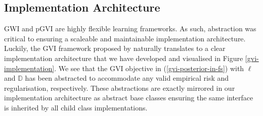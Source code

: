 \documentclass{article}
\numberwithin{equation}{section}
\begin{document}
\subsection{Implementation Architecture}\label{implementation-architecture}
GWI and pGVI are highly flexible learning frameworks. As such, abstraction was critical to ensuring a scaleable and maintainable implementation architecture.
Luckily, the GVI framework proposed by \cite{knoblauch2022optimization} naturally translates to a clear implementation architecture that we have developed and visualised in Figure \ref{gvi-implementation}.
We see that the GVI objective in (\ref{gvi-posterior-in-fs}) with $\ell$ and $\mathbb{D}$ has been abstracted to accommodate any valid empirical risk and regularisation, respectively.
These abstractions are exactly mirrored in our implementation architecture as abstract base classes ensuring the same interface is inherited by all child class implementations.
\end{document}
